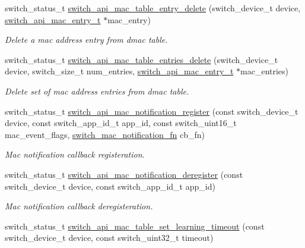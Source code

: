 \begin{DoxyCompactItemize}
switch\+\_\+status\+\_\+t \hyperlink{group__L2_ga79c02c4ecb683896bd7e51ba13a0059c}{switch\+\_\+api\+\_\+mac\+\_\+table\+\_\+entry\+\_\+delete} (switch\+\_\+device\+\_\+t device, \hyperlink{group__L2_ga2fde8bafec6b710770603b5cde2f94af}{switch\+\_\+api\+\_\+mac\+\_\+entry\+\_\+t} $\ast$mac\+\_\+entry)
\begin{DoxyCompactList}\small\item\em Delete a mac address entry from dmac table. \end{DoxyCompactList}\item 
switch\+\_\+status\+\_\+t \hyperlink{group__L2_ga655ed00e1976ad353781a043caa4e957}{switch\+\_\+api\+\_\+mac\+\_\+table\+\_\+entries\+\_\+delete} (switch\+\_\+device\+\_\+t device, switch\+\_\+size\+\_\+t num\+\_\+entries, \hyperlink{group__L2_ga2fde8bafec6b710770603b5cde2f94af}{switch\+\_\+api\+\_\+mac\+\_\+entry\+\_\+t} $\ast$mac\+\_\+entries)
\begin{DoxyCompactList}\small\item\em Delete set of mac address entries from dmac table. \end{DoxyCompactList}\item 
switch\+\_\+status\+\_\+t \hyperlink{group__L2_ga8e6633eee0d025508056b940af6cbb50}{switch\+\_\+api\+\_\+mac\+\_\+notification\+\_\+register} (const switch\+\_\+device\+\_\+t device, const switch\+\_\+app\+\_\+id\+\_\+t app\+\_\+id, const switch\+\_\+uint16\+\_\+t mac\+\_\+event\+\_\+flags, \hyperlink{group__L2_ga233660168fb17cb2141539df12af924c}{switch\+\_\+mac\+\_\+notification\+\_\+fn} cb\+\_\+fn)
\begin{DoxyCompactList}\small\item\em Mac notification callback registeration. \end{DoxyCompactList}\item 
switch\+\_\+status\+\_\+t \hyperlink{group__L2_gaaf7d171d5d9cc7613af6774b0776303f}{switch\+\_\+api\+\_\+mac\+\_\+notification\+\_\+deregister} (const switch\+\_\+device\+\_\+t device, const switch\+\_\+app\+\_\+id\+\_\+t app\+\_\+id)
\begin{DoxyCompactList}\small\item\em Mac notification callback deregisteration. \end{DoxyCompactList}\item 
switch\+\_\+status\+\_\+t \hyperlink{group__L2_ga1bdefa73175159501d6d795545fafc2a}{switch\+\_\+api\+\_\+mac\+\_\+table\+\_\+set\+\_\+learning\+\_\+timeout} (const switch\+\_\+device\+\_\+t device, const switch\+\_\+uint32\+\_\+t timeout)

\end{DoxyCompactItemize}
